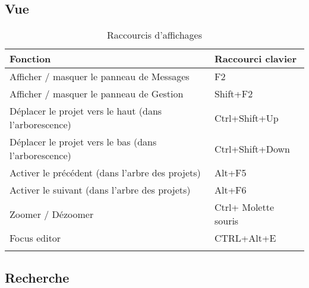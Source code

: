\subsection{Vue}

{\small 
\begin{longtable}{|l|l|}\hline
\textbf{Fonction}		                                &	\textbf{Raccourci clavier}  \\ \hline
\endhead    %
Afficher / masquer le panneau de Messages	            &	F2                          \\ \hline
Afficher / masquer le panneau de Gestion	            &	Shift+F2                    \\ \hline
Déplacer le projet vers le haut (dans l'arborescence)   &   Ctrl+Shift+Up               \\ \hline
Déplacer le projet vers le bas  (dans l'arborescence)   &   Ctrl+Shift+Down             \\ \hline
Activer le précédent (dans l'arbre des projets)         & 	Alt+F5                      \\ \hline
Activer le suivant   (dans l'arbre des projets)         & 	Alt+F6                      \\ \hline
Zoomer / Dézoomer 	                                    &   Ctrl+ Molette souris        \\ \hline
Focus editor 	                                        &   CTRL+Alt+E                  \\ \hline
\caption{Raccourcis d'affichages}
\end{longtable}
}

\subsection{Recherche}

